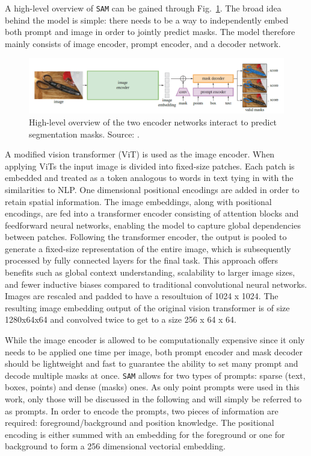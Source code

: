 A high-level overview of \texttt{SAM} can be gained through Fig.~\ref{figsamoverview}. The broad idea behind the model is simple: there needs to be a way to independently embed both prompt and image in order to jointly predict masks. The model therefore mainly consists of image encoder, prompt encoder, and a decoder network.
\begin{figure}
	\centering
	\includegraphics[width=\textwidth]{"images/sam_overview.png"}
	\caption[\texttt{SAM} Overview]{High-level overview of the two encoder networks interact to predict segmentation masks. Source: \cite{kirillov2023segment}.}
	\label{figsamoverview}
\end{figure}
A modified vision transformer \cite{dosovitskiy2020image} (ViT) is used as the image encoder. When applying ViTs the input image is divided into fixed-size patches. Each patch is embedded and treated as a token analogous to words in text tying in with the similarities to NLP. One dimensional positional encodings are added in order to retain spatial information. The image embeddings, along with positional encodings, are fed into a transformer encoder \cite{vaswani2017attention} consisting of attention blocks and feedforward neural networks, enabling the model to capture global dependencies between patches. Following the transformer encoder, the output is pooled to generate a fixed-size representation of the entire image, which is subsequently processed by fully connected layers for the final task. This approach offers benefits such as global context understanding, scalability to larger image sizes, and fewer inductive biases compared to traditional convolutional neural networks. Images are rescaled and padded to have a resoultuion of 1024 x 1024. The resulting image embedding output of the original vision transformer is of size 1280x64x64 and convolved twice to get to a size 256 x 64 x 64. 

While the image encoder is allowed to be computationally expensive since it only needs to be applied one time per image, both prompt encoder and mask decoder should be lightweight and fast to guarantee the ability to set many prompt and decode multiple masks at once. \texttt{SAM} allows for two types of prompts: sparse (text, boxes, points) and dense (masks) ones. As only point prompts were used in this work, only those will be discussed in the following and will simply be referred to as prompts. In order to encode the prompts, two pieces of information are required: foreground/background and position knowledge. The positional encoding is either summed with an embedding for the foreground or one for background to form a 256 dimensional vectorial embedding.

